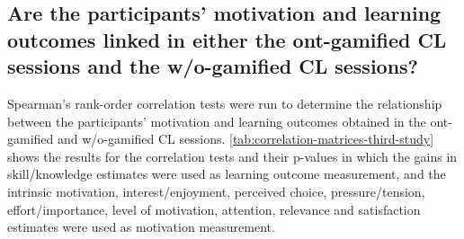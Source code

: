 \subsection*{Are the participants' motivation and learning outcomes linked in either the ont-gamified CL sessions and the w/o-gamified CL sessions?}

Spearman's rank-order correlation tests were run to determine the relationship between the participants' motivation and learning outcomes obtained in the ont-gamified and w/o-gamified CL sessions.
\autoref{tab:correlation-matrices-third-study} shows the results for the correlation tests and their p-values in which the gains in skill/knowledge estimates were used as learning outcome measurement, and the intrinsic motivation, interest/enjoyment, perceived choice, pressure/tension, effort/importance, level of motivation, attention, relevance and satisfaction estimates were used as motivation measurement.


